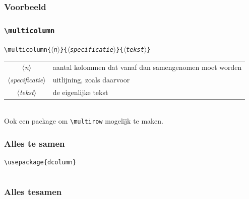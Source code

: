 \begin{frame}[fragile]
  \frametitle{Voorbeeld}

  
\end{frame}

\begin{frame}[fragile]
  \frametitle{\texttt{\textbackslash multicolumn}}

  \texttt{\textbackslash multicolumn\{$\langle$\textsl{n}$\rangle$\}\{$\langle$\textsl{specificatie}$\rangle$\}\{$\langle$\textsl{tekst}$\rangle$\}} \\[1em]

  \begin{tabular}{cl}
    $\langle$\textsl{n}$\rangle$ & aantal kolommen dat vanaf dan samengenomen moet worden \\
    $\langle$\textsl{specificatie}$\rangle$ & uitlijning, zoals daarvoor \\
    $\langle$\textsl{tekst}$\rangle$ & de eigenlijke tekst \\
  \end{tabular} \\[2em]

  Ook een package  om \verb|\multirow| mogelijk te maken.
\end{frame}

\begin{frame}[fragile]
  \frametitle{Alles te samen}

  \scriptsize
  \begin{verbatim}
\usepackage{dcolumn}
  \end{verbatim}
  \inputminted{tex}{table-example-2.tex}
\end{frame}

\begin{frame}
  \frametitle{Alles tesamen}

  
\end{frame}
